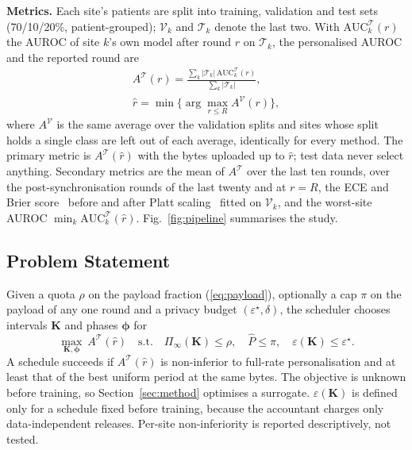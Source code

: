 \textbf{Metrics.} Each site's patients are split into training, validation and test sets (70/10/20\%, patient-grouped); $\mathcal V_k$ and $\mathcal T_k$ denote the last two. With $\mathrm{AUC}_k^{\mathcal T}(r)$ the AUROC of site $k$'s own model after round $r$ on $\mathcal T_k$, the personalised AUROC and the reported round are
\begin{equation}
\begin{gathered}
A^{\mathcal T}(r)=\frac{\sum_{k}|\mathcal T_k|\,\mathrm{AUC}^{\mathcal T}_k(r)}{\sum_{k}|\mathcal T_k|},\\
\hat r=\min\Big\{\arg\max_{r\le R}A^{\mathcal V}(r)\Big\},
\end{gathered}
\label{eq:metric}
\end{equation}
where $A^{\mathcal V}$ is the same average over the validation splits and sites whose split holds a single class are left out of each average, identically for every method. The primary metric is $A^{\mathcal T}(\hat r)$ with the bytes uploaded up to $\hat r$; test data never select anything. Secondary metrics are the mean of $A^{\mathcal T}$ over the last ten rounds, over the post-synchronisation rounds of the last twenty and at $r=R$, the ECE and Brier score~\cite{vancalster2019} before and after Platt scaling~\cite{platt1999} fitted on $\mathcal V_k$, and the worst-site AUROC $\min_k\mathrm{AUC}^{\mathcal T}_k(\hat r)$. Fig.~\ref{fig:pipeline} summarises the study.

\subsection{Problem Statement}
Given a quota $\rho$ on the payload fraction (\ref{eq:payload}), optionally a cap $\pi$ on the payload of any one round and a privacy budget $(\varepsilon^\star,\delta)$, the scheduler chooses intervals $\mathbf K$ and phases $\boldsymbol\phi$ for
\begin{equation}
\max_{\mathbf K,\boldsymbol\phi}\ A^{\mathcal T}(\hat r)\quad\text{s.t.}\quad\Pi_\infty(\mathbf K)\le\rho,\quad\hat P\le\pi,\quad\varepsilon(\mathbf K)\le\varepsilon^\star .
\label{eq:problem}
\end{equation}
A schedule succeeds if $A^{\mathcal T}(\hat r)$ is non-inferior to full-rate personalisation and at least that of the best uniform period at the same bytes. The objective is unknown before training, so Section~\ref{sec:method} optimises a surrogate. $\varepsilon(\mathbf K)$ is defined only for a schedule fixed before training, because the accountant charges only data-independent releases. Per-site non-inferiority is reported descriptively, not tested.
